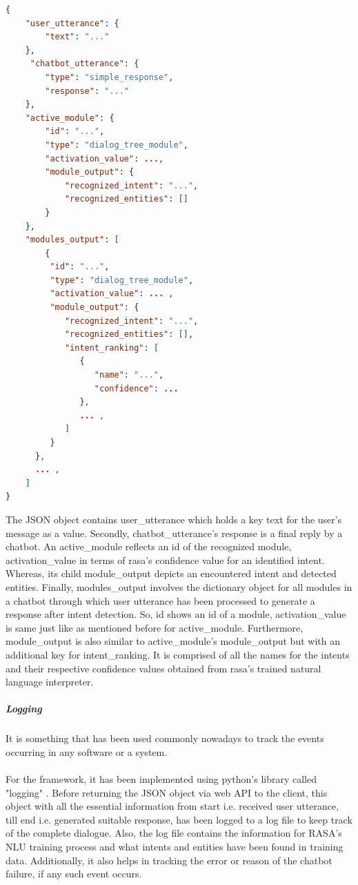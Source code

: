 \begin{minipage}{\linewidth}
\begin{lstlisting}[language=JSON, firstnumber=1, caption=Frankenbot's API JSON Output., label={lst:outputJson}]
{
    "user_utterance": {
        "text": "..."
    }, 
     "chatbot_utterance": {
        "type": "simple_response", 
        "response": "..."
    },
    "active_module": {
        "id": "...", 
        "type": "dialog_tree_module", 
        "activation_value": ..., 
        "module_output": {
            "recognized_intent": "...", 
            "recognized_entities": []
        }
    }, 
    "modules_output": [
        {
         "id": "...",
         "type": "dialog_tree_module",
         "activation_value": ... ,
         "module_output": {
            "recognized_intent": "...",
            "recognized_entities": [],
            "intent_ranking": [
               {
                  "name": "...",
                  "confidence": ...
               },
               ... ,
            ]
         }
      },
      ... ,
    ]
}
\end{lstlisting}
\end{minipage}
The JSON object contains user\_utterance which holds a key text for the user's message as a value. Secondly, chatbot\_utterance's response is a final reply by a chatbot. An active\_module reflects an id of the recognized module, activation\_value in terms of rasa's confidence value for an identified intent. Whereas, its child module\_output depicts an encountered intent and detected entities. Finally, modules\_output involves the dictionary object for all modules in a chatbot through which user utterance has been processed to generate a response after intent detection. So, id shows an id of a module, activation\_value is same just like as mentioned before for active\_module. Furthermore, module\_output is also similar to active\_module's module\_output but with an additional key for intent\_ranking. It is comprised of all the names for the intents and their respective confidence values obtained from rasa's trained natural language interpreter.

\subparagraph*{Logging}
It is something that has been used commonly nowadays to track the events occurring in any software or a system. 
\\~\\
For the framework, it has been implemented using python's library called "logging" \cite{logging}. Before returning the JSON object via web API to the client, this object with all the essential information from start i.e. received user utterance, till end i.e. generated suitable response, has been logged to a log file to keep track of the complete dialogue. Also, the log file contains the information for RASA's NLU training process and what intents and entities have been found in training data. Additionally, it also helps in tracking the error or reason of the chatbot failure, if any such event occurs.  


